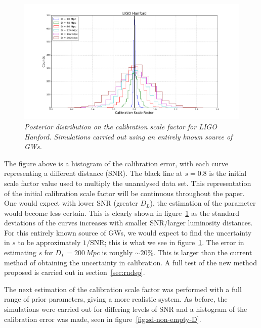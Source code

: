 \documentclass[12pt]{iopart}
\begin{document}
\begin{figure}
  \centering
  \includegraphics[width = \textwidth]{SD_empty_D10_200}
  \caption{\textit{Posterior distribution on the calibration scale factor for
LIGO Hanford. Simulations carried out using an entirely known source of GWs.}}
  \label{fig:sd-empty-D}
\end{figure}

The figure above is a histogram of the calibration error, with each curve
representing a different distance (SNR). The black line at $s = 0.8$ is the
initial scale factor value used to multiply the unanalysed data set. This
representation of the initial calibration scale factor will be continuous
throughout the paper.  One would expect with lower SNR (greater $D_{L}$), the
estimation of the parameter would become less certain. This is clearly shown in
figure~\ref{fig:sd-empty-D} as the standard deviations of the curves increases
with smaller SNR/larger luminosity distances. For this entirely known source of
GWs, we would expect to find the uncertainty in $s$ to be approximately
$1/$SNR; this is what we see in figure~\ref{fig:sd-empty-D}. The error in
estimating $s$ for $D_{L} = 200 \,Mpc$ is roughly $\sim 20\%$. This is larger
than the current method of obtaining the uncertainty in calibration. A full
test of the new method proposed is carried out in section~\ref{sec:rndsp}.

The next estimation of the calibration scale factor was performed with a full
range of prior parameters, giving a more realistic system. As before, the
simulations were carried out for differing levels of SNR and a histogram of the
calibration error was made, seen in figure~\ref{fig:sd-non-empty-D}.
\end{document}
